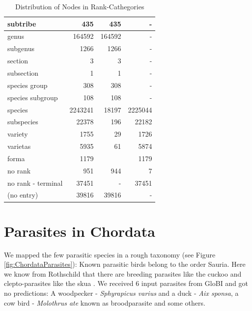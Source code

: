\begin{table}[h!]
\begin{center}
\begin{tabular}{ |l|r||r|r| }
          subtribe & 435                      & 435 & - \\ \hline
          \setrow{\bfseries}genus & 164592    & 164592 & - \\
          subgenus & 1266                     & 1266 & - \\
          section & 3                         & 3 & - \\
          subsection & 1                      & 1 & - \\
          species group & 308                 & 308 & - \\
          species subgroup & 108              & 108 & - \\ \hline
          \setrow{\bfseries}species & 2243241 & 18197 & 2225044 \\
          subspecies & 22378                  & 196 & 22182 \\
          variety & 1755                      & 29 & 1726 \\
          varietas & 5935                     & 61 & 5874 \\
          forma & 1179                        & & 1179 \\
          \hline \hline
          no rank & 951                       & 944 & 7 \\
          no rank - terminal & 37451          & - & 37451 \\
          (no entry) & 39816                  & 39816 & - \\
          \hline  
        \end{tabular}
        \caption{Distribution of Nodes in Rank-Cathegories}
        \label{table:taxa} 
      \end{center}  
    \end{table}

\newpage

  \section{Parasites in Chordata} \label{sec:parasites in chordata}
    We mapped the few parasitic species in a rough taxonomy (see Figure \ref{fig:ChordataParasites}): 
      Known parasitic birds belong to the order Sauria. Here we know from Rothschild that there are 
      breeding parasites like the cuckoo and clepto-parasites like the skua  \cite{Rothschild1957}. We
      received 6 input parasites from GloBI and got no predictions: A woodpecker - 
      \textit{Sphyrapicus varius} and a duck - \textit{Aix sponsa}, a cow bird - \textit{Molothrus ate} 
      known as broodparasite and some others.

